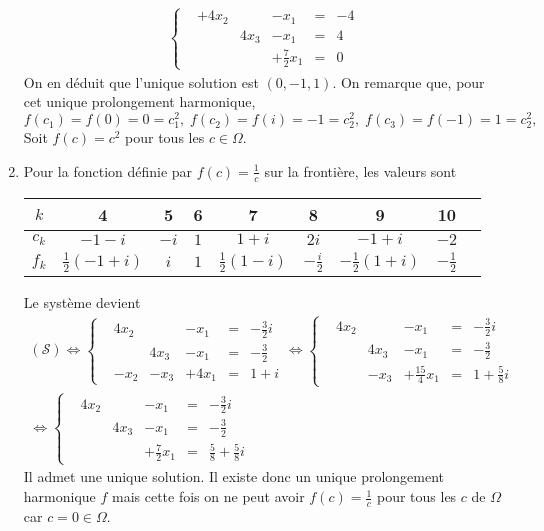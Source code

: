\begin{enumerate}
\begin{multline*}
\left\lbrace  
\begin{aligned}
  &+4x_2  &      &-x_1            &=& -4 \\
  &       &4x_3  &-x_1            &=& 4 \\
  &       &      &+\frac{7}{2}x_1 &=& 0
\end{aligned}
\right. 
\end{multline*}
On en déduit que l'unique solution est $(0,-1,1)$. On remarque que, pour cet unique prolongement harmonique,
\begin{displaymath}
  f(c_1)=f(0)=0=c_1^2,\;f(c_2)=f(i)=-1=c_2^2,\; f(c_3)=f(-1)=1=c_2^2,
\end{displaymath}
Soit $f(c)=c^2$ pour tous les $c\in \Omega$.

\item  Pour la fonction définie par $f(c)=\frac{1}{c}$ sur la frontière, les valeurs sont
\begin{center}
\renewcommand{\arraystretch}{1.5}
\begin{tabular}{|c|c|c|c|c|c|c|c|c|}
\hline 
 $k$   & 4                   & 5    & 6   & 7                  & 8              & 9                   & 10 \\ \hline
 $c_k$ & $-1-i$              & $-i$ & $1$ & $1+i$              & $2i$           & $-1+i$              & $-2$\\  \hline
 $f_k$ & $\frac{1}{2}(-1+i)$ & $i$  & $1$ & $\frac{1}{2}(1-i)$ & $-\frac{i}{2}$ & $-\frac{1}{2}(1+i)$ & $-\frac{1}{2}$ \\ \hline
\end{tabular}
\end{center}
Le système devient
\begin{multline*}
  (\mathcal{S}) \Leftrightarrow
\left\lbrace  
\begin{aligned}
  &4x_2  &      &-x_1  &=& -\frac{3}{2}i \\
  &       &4x_3 &-x_1 &=& -\frac{3}{2} \\
  &-x_2   &-x_3  &+4x_1  &=& 1+i
\end{aligned}
\right. 
\Leftrightarrow
\left\lbrace  
\begin{aligned}
  &4x_2  &      &-x_1               &=& -\frac{3}{2}i \\
  &       &4x_3 &-x_1               &=& -\frac{3}{2} \\
  &       &-x_3  &+\frac{15}{4}x_1  &=& 1+\frac{5}{8}i
\end{aligned}
\right. \\
\Leftrightarrow
\left\lbrace  
\begin{aligned}
  &4x_2  &      &-x_1            &=&  -\frac{3}{2}i \\
  &       &4x_3  &-x_1            &=& -\frac{3}{2} \\
  &       &      &+\frac{7}{2}x_1 &=& \frac{5}{8}+\frac{5}{8}i
\end{aligned}
\right. 
\end{multline*}
Il admet une unique solution. Il existe donc un unique prolongement harmonique $f$ mais cette fois on ne peut avoir $f(c)=\frac{1}{c}$ pour tous les $c$ de $\Omega$ car $c=0\in \Omega$.


\end{enumerate}
